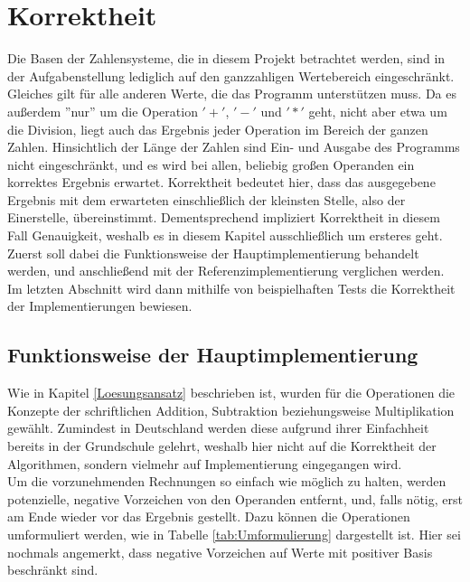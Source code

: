 \documentclass[course=erap]{aspdoc}
\begin{document}
    \section{Korrektheit}

    Die Basen der Zahlensysteme, die in diesem Projekt betrachtet werden, sind in der Aufgabenstellung lediglich auf den ganzzahligen
    Wertebereich eingeschränkt. Gleiches gilt für alle anderen Werte, die das Programm unterstützen muss. Da es außerdem ''nur'' um die
    Operation $'+'$, $'-'$ und $'*'$ geht, nicht aber etwa um die Division, liegt auch das Ergebnis jeder Operation im Bereich der ganzen
    Zahlen. Hinsichtlich der Länge der Zahlen sind Ein- und Ausgabe des Programms nicht eingeschränkt, und es wird bei allen, beliebig großen
    Operanden ein korrektes Ergebnis erwartet. Korrektheit bedeutet hier, dass das ausgegebene Ergebnis mit dem erwarteten einschließlich der
    kleinsten Stelle, also der Einerstelle, übereinstimmt. Dementsprechend impliziert Korrektheit in diesem Fall Genauigkeit, weshalb es in
    diesem Kapitel ausschließlich um ersteres geht. Zuerst soll dabei die Funktionsweise der Hauptimplementierung behandelt werden, und
    anschließend mit der Referenzimplementierung verglichen werden. Im letzten Abschnitt wird dann mithilfe von beispielhaften Tests die
    Korrektheit der Implementierungen bewiesen.

    \subsection{Funktionsweise der Hauptimplementierung}

    Wie in Kapitel \ref{Loesungsansatz} beschrieben ist, wurden für die Operationen die Konzepte der schriftlichen Addition, Subtraktion
    beziehungsweise Multiplikation gewählt. Zumindest in Deutschland werden diese aufgrund ihrer Einfachheit bereits in der Grundschule gelehrt,
    weshalb hier nicht auf die Korrektheit der Algorithmen, sondern vielmehr auf Implementierung eingegangen wird.\\
    Um die vorzunehmenden Rechnungen so einfach wie möglich zu halten, werden potenzielle, negative Vorzeichen von den Operanden entfernt, und,
    falls nötig, erst am Ende wieder vor das Ergebnis gestellt. Dazu können die Operationen umformuliert werden, wie in Tabelle
    \ref{tab:Umformulierung} dargestellt ist. Hier sei nochmals angemerkt, dass negative Vorzeichen auf Werte mit positiver Basis beschränkt
    sind. \\
\end{document}
